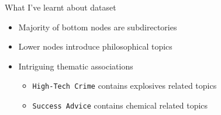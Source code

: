 \begin{frame}{What I've learnt about \acs{dataset}}
    \begin{itemize}
        \item <1-> Majority of bottom nodes are subdirectories
        \item <2-> Lower nodes introduce philosophical topics
        \item <3-> Intriguing thematic associations
        \begin{itemize}
            \item <3-> \texttt{High-Tech Crime} contains explosives related topics
            \item <3-> \texttt{Success Advice} contains chemical related topics
        \end{itemize}
    \end{itemize}
\end{frame}